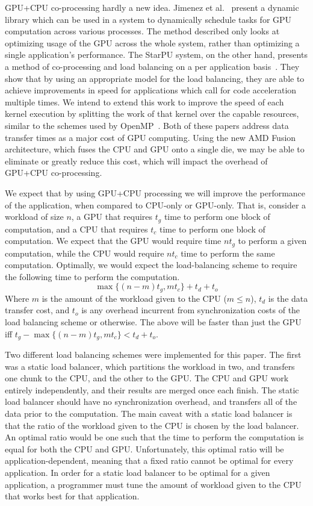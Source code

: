 \documentclass[journal]{IEEEtran}
\begin{document}
GPU+CPU co-processing hardly a new idea.  Jimenez et al.~\cite{Jimenez2009} present a
dynamic library which can be used in a system to dynamically schedule tasks for GPU
computation across various processes. The method described only looks at optimizing
usage of the GPU across the whole system, rather than optimizing a single application’s
performance. The StarPU system, on the other hand, presents a method of co-processing
and load balancing on a per application basis~\cite{Augonnet2009}. They show that by
using an appropriate model for the load balancing, they are able to achieve improvements
in speed for applications which call for code acceleration multiple times.  We intend
to extend this work to improve the speed of each kernel execution by splitting the
work of that kernel over the capable resources, similar to the schemes used by
OpenMP~\cite{Dagum1998}. Both of these papers address data transfer times as a major cost
of GPU computing. Using the new AMD Fusion architecture, which fuses the CPU and GPU onto
a single die, we may be able to eliminate or greatly reduce this cost, which will impact
the overhead of GPU+CPU co-processing.

We expect that by using GPU+CPU processing we will improve the performance of the
application, when compared to CPU-only or GPU-only.  That is, consider a workload of size
$n$, a GPU that requires $t_g$ time to perform one block of computation, and a CPU that
requires $t_c$ time to perform one block of computation. We expect that the GPU would
require time $nt_g$ to perform a given computation, while the CPU would require $nt_c$
time to perform the same computation.  Optimally, we would expect the load-balancing
scheme to require the following time to perform the computation.
\[\max{\{(n-m)t_g, mt_c}\} + t_d + t_o\]
Where $m$ is the amount of the workload given to the CPU ($m \leq n$), $t_d$ is the data
transfer cost, and $t_o$ is any overhead incurrent from synchronization costs of the load
balancing scheme or otherwise.  The above will be faster than just the GPU iff
$t_g - \max{\{(n-m)t_g, mt_c}\} < t_d + t_o$.

Two different load balancing schemes were implemented for this paper.  The first was a
static load balancer, which partitions the workload in two, and transfers one chunk to
the CPU, and the other to the GPU.  The CPU and GPU work entirely independently, and
their results are merged once each finish.  The static load balancer should have no
synchronization overhead, and transfers all of the data prior to the computation.
The main caveat with a static load balancer is that the ratio of the workload given to
the CPU is chosen by the load balancer.  An optimal ratio would be one such that the
time to perform the computation is equal for both the CPU and GPU.  Unfortunately, this
optimal ratio will be application-dependent, meaning that a fixed ratio cannot be optimal
for every application.  In order for a static load balancer to be optimal for a given
application, a programmer must tune the amount of workload given to the CPU that works
best for that application.
\end{document}
